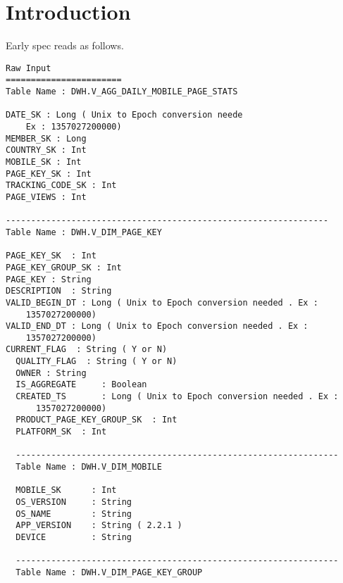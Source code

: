 \usepackage{hyperref}

\section{Introduction}

Early spec reads as follows.
\begin{verbatim}
Raw Input
=======================
Table Name : DWH.V_AGG_DAILY_MOBILE_PAGE_STATS

DATE_SK : Long ( Unix to Epoch conversion neede
    Ex : 1357027200000)
MEMBER_SK : Long
COUNTRY_SK : Int
MOBILE_SK : Int
PAGE_KEY_SK : Int
TRACKING_CODE_SK : Int
PAGE_VIEWS : Int                    

----------------------------------------------------------------
Table Name : DWH.V_DIM_PAGE_KEY

PAGE_KEY_SK  : Int     
PAGE_KEY_GROUP_SK : Int
PAGE_KEY : String 
DESCRIPTION  : String                                                                             
VALID_BEGIN_DT : Long ( Unix to Epoch conversion needed . Ex :
    1357027200000)
VALID_END_DT : Long ( Unix to Epoch conversion needed . Ex :
    1357027200000)
CURRENT_FLAG  : String ( Y or N)
  QUALITY_FLAG  : String ( Y or N)
  OWNER : String
  IS_AGGREGATE     : Boolean                                                                         
  CREATED_TS       : Long ( Unix to Epoch conversion needed . Ex :
      1357027200000)                                                                         
  PRODUCT_PAGE_KEY_GROUP_SK  : Int                                                             
  PLATFORM_SK  : Int                                                         

  ----------------------------------------------------------------
  Table Name : DWH.V_DIM_MOBILE

  MOBILE_SK      : Int                                                                            
  OS_VERSION     : String                                                                            
  OS_NAME        : String                                                                          
  APP_VERSION    : String ( 2.2.1 )                                                                          
  DEVICE         : String                                                                          

  ----------------------------------------------------------------
  Table Name : DWH.V_DIM_PAGE_KEY_GROUP


\end{verbatim}

